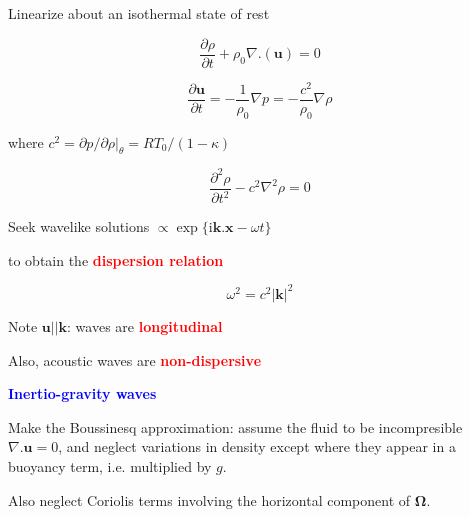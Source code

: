 \documentclass[a4]{seminar}
\newcommand{\ii}{\mathrm{i}}
\newcommand{\R}[1]{\textcolor{red}{#1}}
\newcommand{\B}[1]{\textcolor{blue}{#1}}
\begin{document}
\begin{slide}

Linearize about an isothermal state of rest

\begin{displaymath}
\frac{\partial \rho}{\partial t}  + \rho_0 \nabla . (\mathbf{u})= 0
\end{displaymath}

\begin{displaymath}
\frac{\partial \mathbf{u}}{\partial t}
=
- \frac{1}{\rho_0} \nabla p
=
- \frac{c^2}{\rho_0} \nabla \rho
\end{displaymath}

where \( c^2 =  \partial p /\partial \rho |_\theta = R T_0 / (1 - \kappa)\)

\vspace{3mm}

\begin{displaymath}
\frac{\partial^2 \rho}{\partial t^2}  - c^2 \nabla^2 \rho = 0
\end{displaymath}

\end{slide}


\begin{slide}

Seek wavelike solutions
\( \propto \exp\{ \ii \mathbf{k} . \mathbf{x} - \omega t\}\)

to obtain the \R{\bf dispersion relation}

\begin{displaymath}
\omega^2 = c^2 | \mathbf{k} |^2
\end{displaymath}

\vspace{3mm}

Note \( \mathbf{u} || \mathbf{k} \): waves are \R{\bf longitudinal}

\vspace{2mm}

Also, acoustic waves are \R{\bf non-dispersive}


\end{slide}


\begin{slide}


\B{\bf Inertio-gravity waves}

\vspace{3mm}

Make the Boussinesq approximation: assume the fluid to be incompresible
\( \nabla . \mathbf{u} = 0 \), and neglect variations in density
except where they appear in a buoyancy term, i.e. multiplied by \( g \).

Also neglect Coriolis terms involving the horizontal component
of \( \boldsymbol{\Omega} \).

\end{slide}
\end{document}
